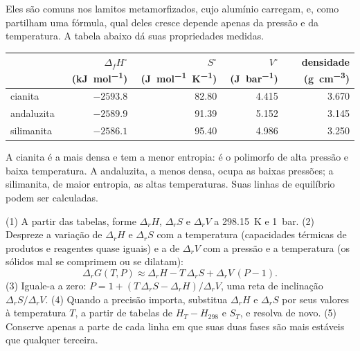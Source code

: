 Eles são comuns nos lamitos metamorfizados, cujo alumínio carregam, e, como
partilham uma fórmula, qual deles cresce depende apenas da pressão e da temperatura. A tabela
abaixo dá suas propriedades medidas.

\begin{center}
\small
\begin{tabular}{@{}lrrrr@{}}
\hline
 & $\Delta_f H^\circ$ (\unit{kJ.mol^{-1}}) & $S^\circ$ (\unit{J.mol^{-1}.K^{-1}}) & $V^\circ$ (\unit{J.bar^{-1}}) & densidade (\unit{g.cm^{-3}})\\
\hline
cianita & $-2593.8$ & 82.80 & 4.415 & 3.670\\
andaluzita & $-2589.9$ & 91.39 & 5.152 & 3.145\\
silimanita & $-2586.1$ & 95.40 & 4.986 & 3.250\\
\hline
\end{tabular}
\par{}
\end{center}

A cianita é a mais densa e tem a menor entropia: é o polimorfo de alta pressão e
baixa temperatura. A andaluzita, a menos densa, ocupa as baixas pressões; a silimanita,
de maior entropia, as altas temperaturas. Suas linhas de equilíbrio podem ser calculadas.

\begin{method}\label{met:b2:metamorphic-facies:line}
(1) A partir das tabelas, forme $\Delta_r H$, $\Delta_r S$ e $\Delta_r V$ a \qty{298.15}{K}
e \qty{1}{bar}. (2) Despreze a variação de $\Delta_r H$ e $\Delta_r S$ com a
temperatura (capacidades térmicas de produtos e reagentes quase iguais) e a de $\Delta_r V$
com a pressão e a temperatura (os sólidos mal se comprimem ou se dilatam):
\[
\Delta_r G(T, P) \approx \Delta_r H - T\,\Delta_r S + \Delta_r V\,(P - 1).
\]
(3) Iguale-a a zero: $P = 1 + (T\,\Delta_r S - \Delta_r H)/\Delta_r V$, uma reta de
inclinação $\Delta_r S/\Delta_r V$. (4) Quando a precisão importa, substitua $\Delta_r H$ e
$\Delta_r S$ por seus valores à temperatura $T$, a partir de tabelas de $H_T - H_{298}$ e $S_T$,
e resolva de novo. (5) Conserve apenas a parte de cada linha em que suas duas fases são mais estáveis
que qualquer terceira.
\end{method}

